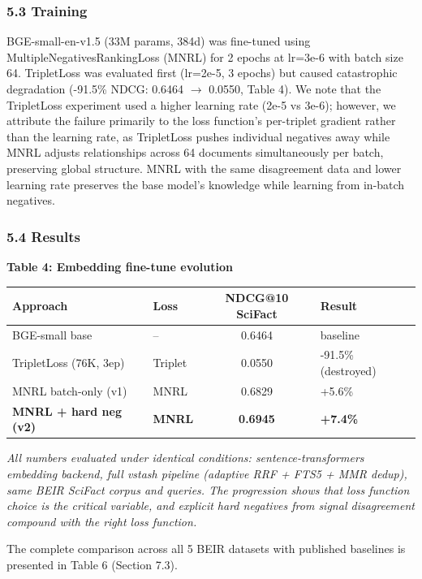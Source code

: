 \documentclass[
  11pt]{article}
\newcounter{none} %
\begin{document}
\subsubsection{5.3 Training}\label{training}

BGE-small-en-v1.5 (33M params, 384d) was fine-tuned using MultipleNegativesRankingLoss (MNRL) for 2 epochs at lr=3e-6 with batch size 64. TripletLoss was evaluated first (lr=2e-5, 3 epochs) but caused catastrophic degradation (-91.5\% NDCG: 0.6464 $\rightarrow$ 0.0550, Table 4). We note that the TripletLoss experiment used a higher learning rate (2e-5 vs 3e-6); however, we attribute the failure primarily to the loss function's per-triplet gradient rather than the learning rate, as TripletLoss pushes individual negatives away while MNRL adjusts relationships across 64 documents simultaneously per batch, preserving global structure. MNRL with the same disagreement data and lower learning rate preserves the base model's knowledge while learning from in-batch negatives.

\subsubsection{5.4 Results}\label{results-1}

\textbf{Table 4: Embedding fine-tune evolution}

{\def\LTcaptype{none} %
\begin{longtable}[]{@{}llcl@{}}
\toprule\noalign{}
Approach & Loss & NDCG@10 SciFact & Result \\
\midrule\noalign{}
\endhead
\bottomrule\noalign{}
\endlastfoot
BGE-small base & -- & 0.6464 & baseline \\
TripletLoss (76K, 3ep) & Triplet & 0.0550 & -91.5\% (destroyed) \\
MNRL batch-only (v1) & MNRL & 0.6829 & +5.6\% \\
\textbf{MNRL + hard neg (v2)} & \textbf{MNRL} & \textbf{0.6945} & \textbf{+7.4\%} \\
\end{longtable}
}

\emph{All numbers evaluated under identical conditions: sentence-transformers embedding backend, full vstash pipeline (adaptive RRF + FTS5 + MMR dedup), same BEIR SciFact corpus and queries. The progression shows that loss function choice is the critical variable, and explicit hard negatives from signal disagreement compound with the right loss function.}

The complete comparison across all 5 BEIR datasets with published baselines is presented in Table 6 (Section 7.3).
\end{document}
